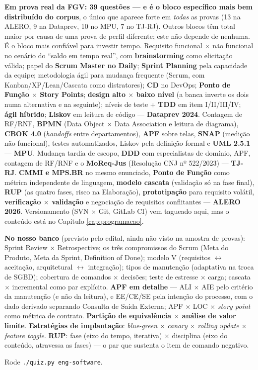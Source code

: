 \begin{jacaiu}
\textbf{Em prova real da FGV: 39 questões --- e é o bloco específico mais bem
distribuído do corpus}, o único que aparece forte em \emph{todas} as provas
(13 na ALERO, 9 na Dataprev, 10 no MPU, 7 no TJ-RJ). Outros blocos têm total
maior por causa de uma prova de perfil diferente; este não depende de nenhuma.
É o bloco mais confiável para investir tempo. Requisito
funcional $\times$ não funcional no cenário do ``saldo em tempo real'', com
\textbf{brainstorming} como elicitação válida; papel do \textbf{Scrum Master
no Daily}; \textbf{Sprint Planning} pela capacidade da equipe; metodologia
ágil para mudança frequente (Scrum, com Kanban/XP/Lean/Cascata como
distratores); \textbf{CD} no DevOps; \textbf{Ponto de Função $\times$ Story
Points}; \textbf{design alto $\times$ baixo nível} (a banca inverte os dois
numa alternativa e na seguinte); níveis de teste + \textbf{TDD} em item
I/II/III/IV; \textbf{ágil híbrido}; \textbf{Liskov} em leitura de código ---
\textbf{Dataprev 2024}. Contagem de RF/RNF, \textbf{BPMN} (Data Object
$\times$ Data Association e leitura de diagrama), \textbf{CBOK 4.0}
(\emph{handoffs} entre departamentos), \textbf{APF} sobre telas,
\textbf{SNAP} (medição não funcional), testes automatizados, Liskov pela
definição formal e \textbf{UML 2.5.1} --- \textbf{MPU}. Mudança tardia de
escopo, \textbf{DDD} com especialistas de domínio, APF, contagem de RF/RNF e
o \textbf{MoReq-Jus} (Resolução CNJ nº 522/2023) --- \textbf{TJ-RJ}.
\textbf{CMMI e MPS.BR} no mesmo enunciado, \textbf{Ponto de Função} como
métrica independente de linguagem, \textbf{modelo cascata} (validação só na
fase final), \textbf{RUP} (as quatro fases, risco na Elaboração),
\textbf{prototipação} para requisito volátil, \textbf{verificação $\times$
validação} e negociação de requisitos conflitantes --- \textbf{ALERO 2026}.
Versionamento (SVN $\times$ Git, GitLab CI) vem tagueado aqui, mas o conteúdo
está no Capítulo \ref{cap:programacao}.

\textbf{No nosso banco} (previsto pelo edital, ainda não visto na amostra de
provas): Sprint Review $\times$ Retrospective; os três compromissos do Scrum
(Meta do Produto, Meta da Sprint, Definition of Done); modelo V (requisitos
$\leftrightarrow$ aceitação, arquitetural $\leftrightarrow$ integração); tipos
de manutenção (adaptativa na troca de SGBD); cobertura de comandos $\times$
decisões; teste de estresse $\times$ carga; cascata $\times$ incremental como
par explícito. \textbf{APF em detalhe} --- ALI $\times$ AIE pelo critério da
manutenção (e não da leitura), e EE/CE/SE pela intenção do processo, com o
dado derivado separando Consulta de Saída Externa; APF $\times$ LOC $\times$
\emph{story point} como métrica de contrato. \textbf{Partição de equivalência
$\times$ análise de valor limite}. \textbf{Estratégias de implantação}:
\emph{blue-green} $\times$ \emph{canary} $\times$ \emph{rolling update}
$\times$ \emph{feature toggle}. \textbf{RUP}: fase (eixo do tempo, iterativa)
$\times$ disciplina (eixo do conteúdo, atravessa as fases) --- o par que
sustenta o item de comando negativo.

Rode \texttt{./quiz.py eng-software}.
\end{jacaiu}

